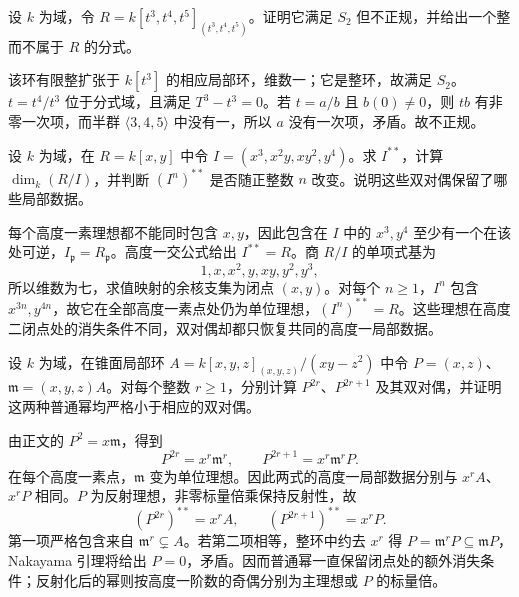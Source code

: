 \begin{exercise}\label{b3:ex:20-cusp-normality-check}
	设 \(k\) 为域，令 \(R=k[t^3,t^4,t^5]_{(t^3,t^4,t^5)}\)。证明它满足 \(S_2\) 但不正规，并给出一个整而不属于 \(R\) 的分式。
\end{exercise}
\begin{solution}
	该环有限整扩张于 \(k[t^3]\) 的相应局部环，维数一；它是整环，故满足 \(S_2\)。\(t=t^4/t^3\) 位于分式域，且满足 \(T^3-t^3=0\)。若 \(t=a/b\) 且 \(b(0)\ne0\)，则 \(tb\) 有非零一次项，而半群 \(\langle3,4,5\rangle\) 中没有一，所以 \(a\) 没有一次项，矛盾。故不正规。
\end{solution}

\begin{optionalexercise}\label{b3:ex:20-reflexive-maximal-ideal}
	设 \(k\) 为域，在 \(R=k[x,y]\) 中令 \(I=(x^3,x^2y,xy^2,y^4)\)。求 \(I^{**}\)，计算 \(\dim_k(R/I)\)，并判断 \((I^n)^{**}\) 是否随正整数 \(n\) 改变。说明这些双对偶保留了哪些局部数据。
\end{optionalexercise}
\begin{solution}
	每个高度一素理想都不能同时包含 \(x,y\)，因此包含在 \(I\) 中的 \(x^3,y^4\) 至少有一个在该处可逆，\(I_{\mathfrak p}=R_{\mathfrak p}\)。高度一交公式给出 \(I^{**}=R\)。商 \(R/I\) 的单项式基为
	\[
		1,x,x^2,y,xy,y^2,y^3,
	\]
	所以维数为七，求值映射的余核支集为闭点 \((x,y)\)。对每个 \(n\ge1\)，\(I^n\) 包含 \(x^{3n},y^{4n}\)，故它在全部高度一素点处仍为单位理想，\((I^n)^{**}=R\)。这些理想在高度二闭点处的消失条件不同，双对偶却都只恢复共同的高度一局部数据。
\end{solution}

\begin{optionalexercise}\label{b3:ex:20-reflexive-product-quadric}
	设 \(k\) 为域，在锥面局部环 \(A=k[x,y,z]_{(x,y,z)}/(xy-z^2)\) 中令 \(P=(x,z)\)、\(\mathfrak m=(x,y,z)A\)。对每个整数 \(r\ge1\)，分别计算 \(P^{2r}\)、\(P^{2r+1}\) 及其双对偶，并证明这两种普通幂均严格小于相应的双对偶。
\end{optionalexercise}
\begin{solution}
	由正文的 \(P^2=x\mathfrak m\)，得到
	\[
		P^{2r}=x^r\mathfrak m^r,\qquad P^{2r+1}=x^r\mathfrak m^rP.
	\]
	在每个高度一素点，\(\mathfrak m\) 变为单位理想。因此两式的高度一局部数据分别与 \(x^rA\)、\(x^rP\) 相同。\(P\) 为反射理想，非零标量倍乘保持反射性，故
	\[
		(P^{2r})^{**}=x^rA,\qquad (P^{2r+1})^{**}=x^rP.
	\]
	第一项严格包含来自 \(\mathfrak m^r\subsetneq A\)。若第二项相等，整环中约去 \(x^r\) 得 \(P=\mathfrak m^rP\subseteq\mathfrak mP\)，Nakayama 引理将给出 \(P=0\)，矛盾。因而普通幂一直保留闭点处的额外消失条件；反射化后的幂则按高度一阶数的奇偶分别为主理想或 \(P\) 的标量倍。
\end{solution}

